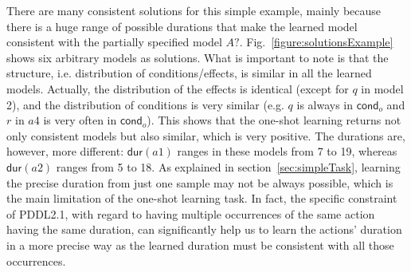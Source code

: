 \documentclass[runningheads]{llncs}
\newcommand{\cond}{\mathsf{cond}}  %
\newcommand{\dur}{\mathsf{dur}}    %
\begin{document}
There are many consistent solutions for this simple example, mainly because there is a huge range of possible durations that make the learned model consistent with the partially specified model $A?$.
Fig.~\ref{figure:solutionsExample} shows six arbitrary models as solutions. What is important to note is that the structure, i.e. distribution of conditions/effects, is similar in all the learned models. Actually, the distribution of the effects is identical (except for $q$ in model 2), and the distribution of conditions is very similar (e.g. $q$ is always in $\cond_o$ and $r$ in $a4$ is very often in $\cond_o$).
This shows that the one-shot learning returns not only consistent models but also similar, which is very positive.
The durations are, however, more different: $\dur(a1)$ ranges in these models from 7 to 19, whereas $\dur(a2)$ ranges from 5 to 18. As explained in section~\ref{sec:simpleTask}, learning the precise duration from just one sample may not be always possible, which is the main limitation of the one-shot learning task.
In fact, the specific constraint of PDDL2.1, with regard to having multiple occurrences of the same action having the same duration, can significantly help us to learn the actions' duration in a more precise way as the learned duration must be consistent with all those occurrences.
\end{document}
